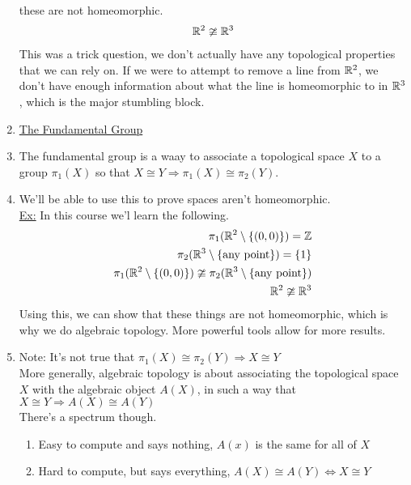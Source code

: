 \begin{enumerate}
            these are not homeomorphic.
            \begin{align*}
                \mathbb{R}^2 \ncong \mathbb{R}^3\\
            \end{align*}
            This was a trick question, we don't actually have any topological properties that we can rely on. If we were
            to attempt to remove a line from $\mathbb{R}^2$, we don't have enough information about what the line is homeomorphic to
            in $\mathbb{R}^3$, which is the major stumbling block.
        \item\underline{The Fundamental Group}
        \item The fundamental group is a waay to associate a topological space $X$ to a group $\pi_1(X)$ so that
            $X\cong Y \Rightarrow \pi_1(X)\cong\pi_2(Y)$. 
        \item We'll be able to use this to prove spaces aren't homeomorphic.\\
            \underline{Ex:} In this course we'l learn the following.
            \begin{align*}
                \pi_1(\mathbb{R}^2\setminus\{(0,0)\})=\mathbb{Z}\\
                \pi_2(\mathbb{R}^3\setminus\{\text{any point}\})=\{1\}\\
                \pi_1(\mathbb{R}^2\setminus\{(0,0)\})\ncong \pi_2(\mathbb{R}^3\setminus\{\text{any point}\})\\
                \mathbb{R}^2\ncong\mathbb{R}^3\\
            \end{align*}
            Using this, we can show that these things are not homeomorphic, which is why we do algebraic topology.
            More powerful tools allow for more results.
        \item Note: It's not true that $\pi_1(X)\cong \pi_2(Y)\Rightarrow X\cong Y$\\
            More generally, algebraic topology is about associating the topological space $X$ 
            with the algebraic object $A(X)$, in such a way that $X\cong Y \Rightarrow A(X)\cong A(Y)$\\
            There's a spectrum though.
            \begin{enumerate}
                \item Easy to compute and says nothing, $A(x)$ is the same for all of $X$
                \item Hard to compute, but says everything, $A(X)\cong A(Y) \iff X\cong Y$
            \end{enumerate}
    \end{enumerate}
